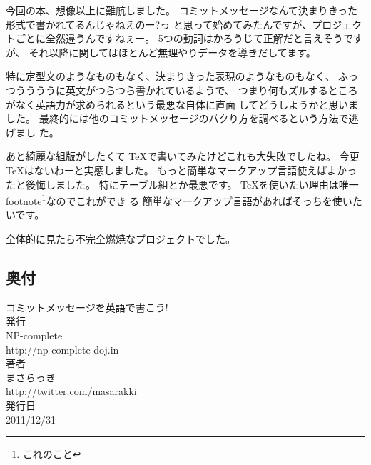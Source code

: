 \documentclass{jarticle}
\begin{document}
  今回の本、想像以上に難航しました。
  コミットメッセージなんて決まりきった形式で書かれてるんじゃねえのー?っ
  と思って始めてみたんですが、プロジェクトごとに全然違うんですねぇー。
  5つの動詞はかろうじて正解だと言えそうですが、
  それ以降に関してはほとんど無理やりデータを導きだしてます。

  特に定型文のようなものもなく、決まりきった表現のようなものもなく、
  ふっつううううに英文がつらつら書かれているようで、
  つまり何もズルするところがなく英語力が求められるという最悪な自体に直面
  してどうしようかと思いました。
  最終的には他のコミットメッセージのパクり方を調べるという方法で逃げまし
  た。

  あと綺麗な組版がしたくて \TeX で書いてみたけどこれも大失敗でしたね。
  今更 \TeX はないわーと実感しました。
  もっと簡単なマークアップ言語使えばよかったと後悔しました。
  特にテーブル組とか最悪です。
  \TeX を使いたい理由は唯一footnote\footnote{これのこと}なのでこれができ
  る
  簡単なマークアップ言語があればそっちを使いたいです。

  全体的に見たら不完全燃焼なプロジェクトでした。

  \newpage
  \begin{center}
   \Large
   \section*{奥付}
   {\huge コミットメッセージを英語で書こう!}
   \\[2.0cm]
   発行\\
   NP-complete\\
   http://np-complete-doj.in
   \\[1.5cm]
   著者\\
   まさらっき\\
   http://twitter.com/masarakki
   \\[2.5cm]
   発行日\\
   2011/12/31
  \end{center}
\end{document}
